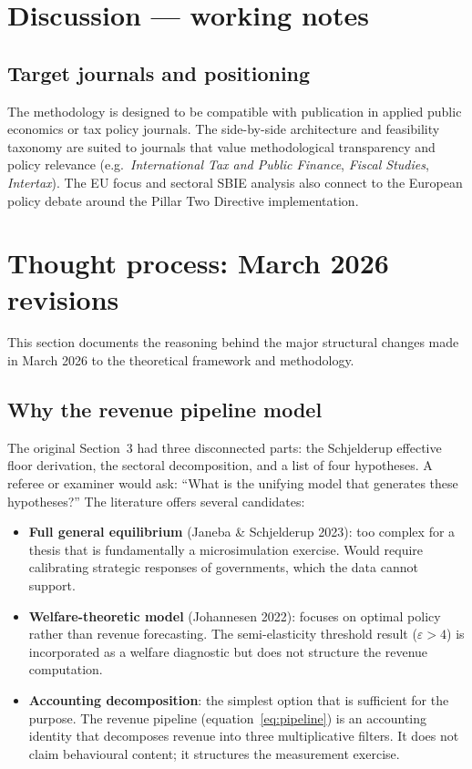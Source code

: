 \documentclass[11pt,a4paper]{article}
\begin{document}
\section{Discussion --- working notes}\label{w:discussion}

\subsection{Target journals and positioning}

The methodology is designed to be compatible with publication in applied public economics or tax policy journals. The side-by-side architecture and feasibility taxonomy are suited to journals that value methodological transparency and policy relevance (e.g.\ \emph{International Tax and Public Finance}, \emph{Fiscal Studies}, \emph{Intertax}). The EU focus and sectoral SBIE analysis also connect to the European policy debate around the Pillar Two Directive implementation.

\section{Thought process: March 2026 revisions}\label{w:thought_process}

This section documents the reasoning behind the major structural changes made in March 2026 to the theoretical framework and methodology.

\subsection{Why the revenue pipeline model}

The original Section~3 had three disconnected parts: the Schjelderup effective floor derivation, the sectoral decomposition, and a list of four hypotheses. A referee or examiner would ask: ``What is the unifying model that generates these hypotheses?'' The literature offers several candidates:

\begin{itemize}[noitemsep]
\item \textbf{Full general equilibrium} (Janeba \& Schjelderup 2023): too complex for a thesis that is fundamentally a microsimulation exercise. Would require calibrating strategic responses of governments, which the data cannot support.
\item \textbf{Welfare-theoretic model} (Johannesen 2022): focuses on optimal policy rather than revenue forecasting. The semi-elasticity threshold result ($\varepsilon > 4$) is incorporated as a welfare diagnostic but does not structure the revenue computation.
\item \textbf{Accounting decomposition}: the simplest option that is sufficient for the purpose. The revenue pipeline (equation~\eqref{eq:pipeline}) is an accounting identity that decomposes revenue into three multiplicative filters. It does not claim behavioural content; it structures the measurement exercise.
\end{itemize}
\end{document}
